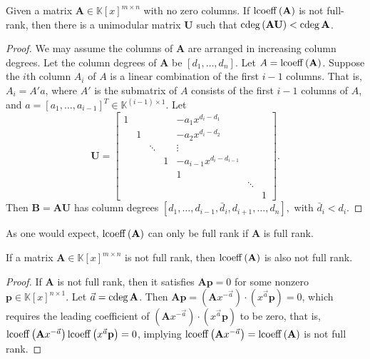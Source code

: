 \begin{lem}
\label{lem:columnOperationToReduceDegree}Given a matrix $\mathbf{A}\in\mathbb{K}\left[x\right]^{m\times n}$
with no zero columns. If $\operatorname{lcoeff}\left(\mathbf{A}\right)$ is not
full-rank, then there is a unimodular matrix $\mathbf{U}$ such that
$\cdeg\left(\mathbf{A}\mathbf{U}\right)<\cdeg\mathbf{A}$.\end{lem}
\begin{proof}
We may assume the columns of $\mathbf{A}$ are arranged in increasing
column degrees. Let the column degrees of $\mathbf{A}$ be $\left[d_{1},\dots,d_{n}\right]$.
Let $A=\operatorname{lcoeff}\left(\mathbf{A}\right)$. Suppose the $i$th column
$A_{i}$ of $A$ is a linear combination of the first $i-1$ columns.
That is, $A_{i}=A'a$, where $A'$ is the submatrix of $A$ consists
of the first $i-1$ columns of $A$, and $a=\left[a_{1},\dots,a_{i-1}\right]^{T}\in\mathbb{K}^{(i-1)\times1}$.
Let 
\[
\mathbf{U}=\begin{bmatrix}1 &  &  &  & -a_{1}x^{d_{i}-d_{1}}\\
 & 1 &  &  & -a_{2}x^{d_{i}-d_{2}}\\
 &  & \ddots &  & \vdots\\
 &  &  & 1 & -a_{i-1}x^{d_{i}-d_{i-1}}\\
 &  &  &  & 1\\
 &  &  &  &  & \ddots\\
 &  &  &  &  &  & 1
\end{bmatrix}.
\]
Then $\mathbf{B}=\mathbf{A}\mathbf{U}$ has column degrees $\left[d_{1},\dots,d_{i-1},\bar{d}{}_{i},d_{i+1},\dots,d_{n}\right],$
with $\bar{d}_{i}<d_{i}$.
\end{proof}
As one would expect, $\operatorname{lcoeff}\left(\mathbf{A}\right)$ can only be
full rank if $\mathbf{A}$ is full rank.
\begin{lem}
\label{lem:fullRankLcoeffImpliesFullRank}If a matrix $\mathbf{A}\in\mathbb{K}\left[x\right]^{m\times n}$
is not full rank, then $\operatorname{lcoeff}\left(\mathbf{A}\right)$ is also not
full rank.\end{lem}
\begin{proof}
If $\mathbf{A}$ is not full rank, then it satisfies $\mathbf{A}\mathbf{p}=0$
for some nonzero $\mathbf{p}\in\mathbb{K}\left[x\right]^{n\times1}$.
Let $\vec{a}=\cdeg\mathbf{A}$. Then $\mathbf{A}\mathbf{p}=\left(\mathbf{A}x^{-\vec{a}}\right)\cdot\left(x^{\vec{a}}\mathbf{p}\right)=0$,
which requires the leading coefficient of $\left(\mathbf{A}x^{-\vec{a}}\right)\cdot\left(x^{\vec{a}}\mathbf{p}\right)$
to be zero, that is, $\operatorname{lcoeff}\left(\mathbf{A}x^{-\vec{a}}\right)\operatorname{lcoeff}\left(x^{\vec{a}}\mathbf{p}\right)=0$,
implying $\operatorname{lcoeff}\left(\mathbf{A}x^{-\vec{a}}\right)=\operatorname{lcoeff}\left(\mathbf{A}\right)$
is not full rank.
\end{proof}
